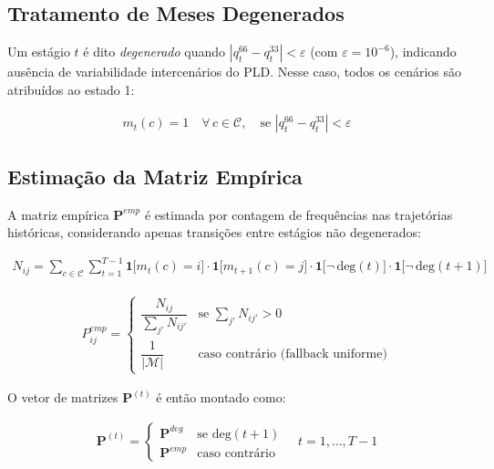 \documentclass{article}
\begin{document}
\subsection{Tratamento de Meses Degenerados}

Um estágio $t$ é dito \emph{degenerado} quando $|q^{66}_t - q^{33}_t| < \varepsilon$
(com $\varepsilon = 10^{-6}$), indicando ausência de variabilidade intercenários do PLD.
Nesse caso, todos os cenários são atribuídos ao estado 1:

\begin{align}
    m_t(c) = 1 \quad \forall\, c \in \mathcal{C}, \quad
    \text{se } |q^{66}_t - q^{33}_t| < \varepsilon
\end{align}

\subsection{Estimação da Matriz Empírica}

A matriz empírica $\mathbf{P}^{emp}$ é estimada por contagem de frequências nas trajetórias
históricas, considerando apenas transições entre estágios não degenerados:

\begin{align}
    N_{ij} = \sum_{c \in \mathcal{C}} \sum_{t=1}^{T-1}
    \mathbf{1}\bigl[m_t(c) = i\bigr] \cdot \mathbf{1}\bigl[m_{t+1}(c) = j\bigr]
    \cdot \mathbf{1}\bigl[\neg\,\text{deg}(t)\bigr] \cdot \mathbf{1}\bigl[\neg\,\text{deg}(t+1)\bigr]
\end{align}

\begin{align}
    P^{emp}_{ij} =
    \begin{cases}
        \dfrac{N_{ij}}{\sum_{j'} N_{ij'}} & \text{se } \sum_{j'} N_{ij'} > 0 \\[6pt]
        \dfrac{1}{|\mathcal{M}|}           & \text{caso contrário (fallback uniforme)}
    \end{cases}
\end{align}

O vetor de matrizes $\mathbf{P}^{(t)}$ é então montado como:

\begin{align}
    \mathbf{P}^{(t)} =
    \begin{cases}
        \mathbf{P}^{deg} & \text{se } \text{deg}(t+1) \\
        \mathbf{P}^{emp} & \text{caso contrário}
    \end{cases}
    \quad t = 1, \ldots, T-1
\end{align}
\end{document}
